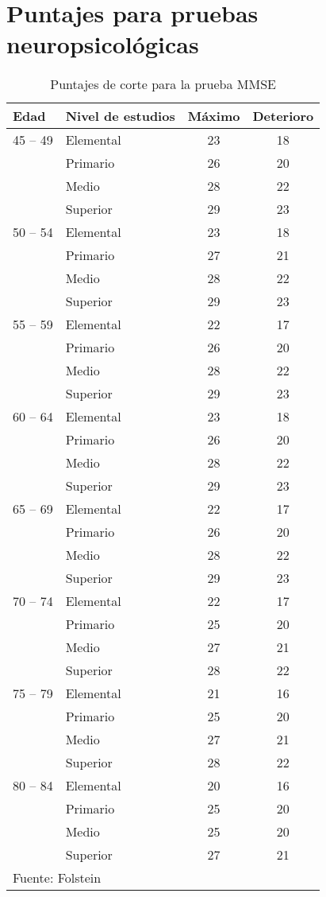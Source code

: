 
\chapter{Puntajes para pruebas neuropsicológicas}
\label{apendice_pruebas}

\begin{table}
\centering
\caption{Puntajes de corte para la prueba MMSE}
\begin{tabular}{llcc}
\toprule
Edad & Nivel de estudios & Máximo & Deterioro \\
\midrule
45 -- 49&Elemental&23&18 \\
&Primario&26&20 \\
&Medio&28&22 \\
&Superior&29&23 \\
\midrule
50 -- 54&Elemental&23&18 \\
&Primario&27&21 \\
&Medio&28&22 \\
&Superior&29&23 \\
\midrule
55 -- 59&Elemental&22&17 \\
&Primario&26&20 \\
&Medio&28&22 \\
&Superior&29&23 \\
\midrule
60 -- 64&Elemental&23&18 \\
&Primario&26&20 \\
&Medio&28&22 \\
&Superior&29&23 \\
\midrule
65 -- 69&Elemental&22&17 \\
&Primario&26&20 \\
&Medio&28&22 \\
&Superior&29&23 \\
\midrule
70 -- 74&Elemental&22&17 \\
&Primario&25&20 \\
&Medio&27&21 \\
&Superior&28&22 \\
\midrule
75 -- 79&Elemental&21&16 \\
&Primario&25&20 \\
&Medio&27&21 \\
&Superior&28&22 \\
\midrule
80 -- 84&Elemental&20&16 \\
&Primario&25&20 \\
&Medio&25&20 \\
&Superior&27&21 \\
\bottomrule
\multicolumn{2}{l}{Fuente: Folstein \cite{crum93}}
\end{tabular}
\end{table}
